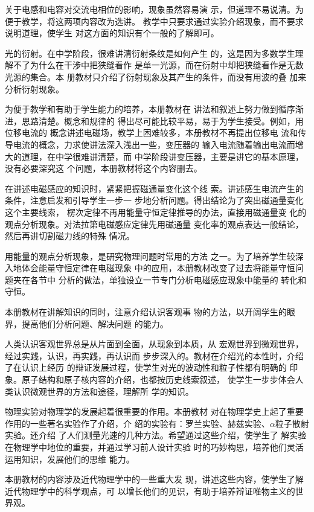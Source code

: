 关于电感和电容对交流电相位的影响，现象虽然容易演
示，但道理不易说清。为便于教学，将这两项内容改为选讲。
教学中只要求通过实验介绍现象，而不要求说明道理，使学生
对这方面的知识有个一般的了解即可。

光的衍射。在中学阶段，很难讲清衍射条纹是如何产生
的，这是因为多数学生理解不了为什么在干涉中把狭缝看作
是单一光源，而在衍射中却把狭缝看作是无数光源的集合。本
册教材只介绍了衍射现象及其产生的条件，而没有用波的叠
加来分析衍射现象。

为便于教学和有助于学生能力的培养，本册教材在
讲法和叙述上努力做到循序渐进，思路清楚。概念和规律的
得出尽可能比较平易，易于为学生接受。例如，用位移电流的
概念讲述电磁场，教学上困难较多，本册教材不再提出位移电
流和传导电流的概念，力求使讲法深入浅出一些，变压器的
输入电流随着输出电流而增大的道理，在中学很难讲清楚，而
中学阶段讲变压器，主要是讲它的基本原理，没有必要深究这
个问题，本册教材将这个内容删去。

在讲述电磁感应的知识时，紧紧把握磁通量变化这个线
索。讲述感生电流产生的条件，注意启发和引导学生一步一
步地分析问题。得出结论为了突出磁通量变化这个主要线索，
楞次定律不再用能量守恒定律推导的办法，直接用磁通量变
化的观点分析现象。对法拉第电磁感应定律先用磁通量
变化率的观点表达一般结论，然后再讲切割磁力线的特殊
情况。

用能量的观点分析现象，是研究物理问题时常用的方法
之一。为了培养学生较深入地体会能量守恒定律在电磁现象
中的应用，本册教材改变了过去将能量守恒问题夹在各节中
分析的做法，单独设立一节专门分析电磁感应现象中能量的
转化和守恒。

本册教材在讲解知识的同时，注意介绍认识客观事
物的方法，以开阔学生的眼界，提高他们分析问题、解决问题
的能力。

人类认识客观世界总是从片面到全面，从现象到本质，从
宏观世界到微观世界，经过实践，认识，再实践，再认识而
步步深入的。教材在介绍光的本性时，介绍了在认识上经历
的辩证发展过程，使学生对光的波动性和粒子性都有明确的
印象。原子结构和原子核内容的介绍，也都按历史线索叙述，
使学生一步步体会人类认识微观世界的方法和途径，理解所
学的知识。

物理实验对物理学的发展起着很重要的作用。本册教材
对在物理学史上起了重要作用的一些著名实验作了介绍，介
绍的实验有：罗兰实验、赫兹实验、$\alpha$粒子散射实验。还介绍
了人们测量光速的几种方法。希望通过这些介绍，使学生了
解实验在物理学中地位的重要，并通过学习前人设计实验
时的巧妙构思，培养他们灵活运用知识，发展他们的思维
能力。

本册教材的内容涉及近代物理学中的一些重大发
现，讲述这些内容，使学生了解近代物理学中的科学观点，可
以增长他们的见识，有助于培养辩证唯物主义的世界观。

